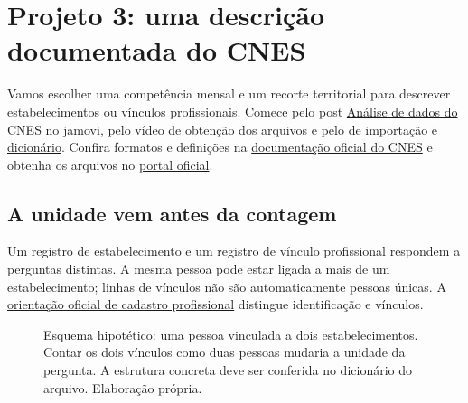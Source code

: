 \section{Projeto 3: uma descrição documentada do CNES}

Vamos escolher uma competência mensal e um recorte territorial para descrever estabelecimentos ou vínculos profissionais. Comece pelo post \href{https://www.balaiocientifico.com/2025/04/analise-de-dados-do-cnes-no-jamovi.html}{Análise de dados do CNES no jamovi}, pelo vídeo de \href{https://www.youtube.com/watch?v=yp9d8hDmsew}{obtenção dos arquivos} e pelo de \href{https://www.youtube.com/watch?v=0Jcaehp7f8Y}{importação e dicionário}. Confira formatos e definições na \href{https://cnes.datasus.gov.br/pages/downloads/documentacao.jsp}{documentação oficial do CNES} e obtenha os arquivos no \href{https://cnes.datasus.gov.br/pages/downloads/arquivosBaseDados.jsp}{portal oficial}.

\subsection{A unidade vem antes da contagem}

Um registro de estabelecimento e um registro de vínculo profissional respondem a perguntas distintas. A mesma pessoa pode estar ligada a mais de um estabelecimento; linhas de vínculos não são automaticamente pessoas únicas. A \href{https://wiki.saude.gov.br/cnes/index.php/Como_cadastrar_um_profissional_no_CNES}{orientação oficial de cadastro profissional} distingue identificação e vínculos.

\begin{figure}[H]
\centering
{}
\caption{Esquema hipotético: uma pessoa vinculada a dois estabelecimentos. Contar os dois vínculos como duas pessoas mudaria a unidade da pergunta. A estrutura concreta deve ser conferida no dicionário do arquivo. Elaboração própria.}
\label{fig:cnes-unidades}
\end{figure}

